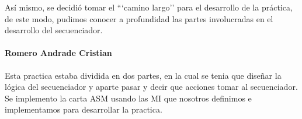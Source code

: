 \documentclass[table]{scrartcl}
\begin{document}
Así mismo, se decidió tomar el ```camino largo'' para el desarrollo de la práctica,
de este modo, pudimos conocer a profundidad las partes involucradas en el
desarrollo del secuenciador.

\paragraph{Romero Andrade Cristian}

Esta practica estaba dividida en dos partes, en la cual se tenia que diseñar la
lógica del secuenciador y aparte pasar y decir que acciones tomar al
secuenciador. Se implemento la carta ASM usando las MI que nosotros definimos e
implementamos para desarrollar la practica.

\nocite{*}
\printbibliography{}


\listoftables{}
\listoffigures{}
\listoflistings{}
\end{document}
